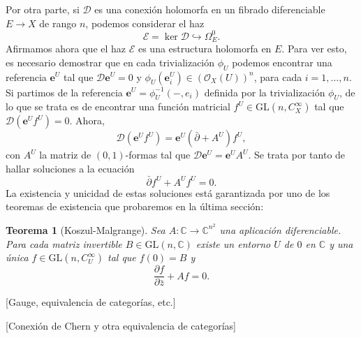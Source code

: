 \documentclass[12pt,a4paper]{article}
\newtheorem{thm}{Teorema}[section]
\theoremstyle{definition} \newtheorem{defn}[thm]{Definición}
\theoremstyle{definition} \newtheorem{ejemplo}[thm]{Ejemplo}
\theoremstyle{definition} \newtheorem{ejercicio}[thm]{Ejercicio}
\def\CC{\mathbb{C}}
\def\OO{\mathscr{O}}
\def\GL{\mathrm{GL}}
\def\delbar{\bar{\partial}}
\begin{document}
Por otra parte, si $\mathcal{D}$ es una conexión holomorfa en un fibrado diferenciable $E\rightarrow X$ de rango $n$, podemos considerar el haz
\begin{equation*}
  \mathscr{E}=\ker \mathcal{D} \hookrightarrow \Omega^0_E.
\end{equation*}
Afirmamos ahora que el haz $\mathscr{E}$ es una estructura holomorfa en $E$. Para ver esto, es necesario demostrar que en cada trivialización $\phi_U$ podemos encontrar una referencia $\mathbf{e}^U$ tal que $\mathcal{D} \mathbf{e}^U=0$ y $\phi_U(\mathbf{e}_i^U) \in (\OO_X(U))^n$, para cada $i= 1,\dots,n$. Si partimos de la referencia $\mathbf{e}^U=\phi_U^{-1}(-,e_i)$ definida por la trivialización $\phi_U$, de lo que se trata es de encontrar una función matricial $f^U \in \mathrm{GL}(n,C^\infty_X)$ tal que $\mathcal{D} (\mathbf{e}^U f^U)=0$. Ahora, 
\begin{equation*}
  \mathcal{D}(\mathbf{e}^U f^U) = \mathbf{e}^U (\delbar + A^U) f^U,
\end{equation*}
con $A^U$ la matriz de $(0,1)$-formas tal que $\mathcal{D} \mathbf{e}^U = \mathbf{e}^U A^U$. Se trata por tanto de hallar soluciones a la ecuación
\begin{equation*}
  \delbar f^U + A^U f^U = 0.
\end{equation*}
La existencia y unicidad de estas soluciones está garantizada por uno de los teoremas de existencia que probaremos en la última sección:

\begin{thm}[Koszul-Malgrange]
  Sea $A:\CC \rightarrow \CC^{n^2}$ una aplicación diferenciable. Para cada matriz invertible $B\in \GL(n,\CC)$ existe un entorno $U$ de $0$ en $\CC$ y una única $f \in \GL(n,C^\infty_U)$ tal que $f(0)=B$ y
  \begin{equation*}
    \frac{\partial f}{\partial \bar{z}} +  A f = 0.
  \end{equation*}
\end{thm}

[Gauge, equivalencia de categorías, etc.]

[Conexión de Chern y otra equivalencia de categorías]
\end{document}
